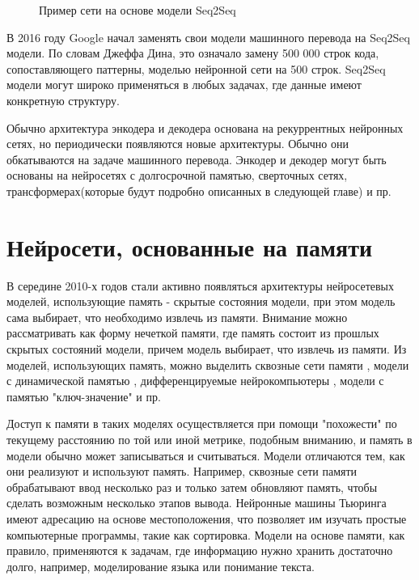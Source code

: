 \begin{figure}[ht]
  \caption{Пример сети на основе модели Seq2Seq}\label{fig:Neuro6-Seq2Seq}
\end{figure}


    В 2016 году Google начал заменять свои модели машинного перевода на Seq2Seq модели. По словам Джеффа Дина, это означало замену 500 000 строк кода, сопоставляющего паттерны,  моделью нейронной сети на 500 строк. Seq2Seq модели могут широко применяться в любых задачах, где данные имеют конкретную структуру.
    
Обычно архитектура энкодера и декодера основана на рекуррентных нейронных сетях, но периодически появляются новые архитектуры. Обычно они обкатываются на задаче машинного перевода. Энкодер и декодер могут быть основаны на нейросетях с долгосрочной памятью, сверточных сетях, трансформерах(которые будут подробно описанных в следующей главе) и пр.

\section{Нейросети, основанные на памяти}
В середине 2010-х годов стали активно появляться архитектуры нейросетевых моделей, использующие память - скрытые состояния модели, при этом модель сама выбирает, что необходимо извлечь из памяти. 
     Внимание можно рассматривать как форму нечеткой памяти, где память состоит из прошлых скрытых состояний модели, причем модель выбирает, что извлечь из памяти.  Из моделей, использующих память, можно выделить сквозные сети памяти \cite{Sukhbaatar_Szlam_Weston_Fergus_2015}, модели с динамической памятью \cite{Kumar_Irsoy_Ondruska_Iyyer_Bradbury_Gulrajani_Zhong_Paulus_Socher_2016}, дифференцируемые нейрокомпьютеры \cite{Graves_Wayne_Reynolds_Harley_Danihelka_Grabska-Barwińska_Colmenarejo_Grefenstette_Ramalho_Agapiou_et al._2016}, модели с памятью "ключ-значение" \cite{Miller_Fisch_Dodge_Karimi_Bordes_Weston_2016} и пр.
 
     Доступ к памяти в таких моделях осуществляется при помощи "похожести" по текущему расстоянию по той или иной метрике, подобным вниманию, и память в модели обычно может записываться и считываться.  Модели отличаются тем, как они реализуют и используют память. Например, сквозные сети памяти обрабатывают ввод несколько раз и только затем обновляют память, чтобы сделать возможным несколько этапов вывода.  Нейронные машины Тьюринга имеют адресацию на основе местоположения, что позволяет им изучать простые компьютерные программы, такие как сортировка.  Модели на основе памяти, как правило, применяются к задачам, где информацию нужно хранить достаточно долго, например, моделирование языка или понимание текста.  
